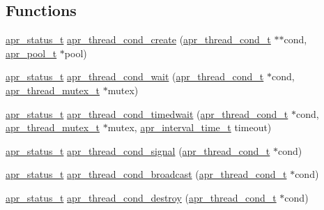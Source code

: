 \subsection*{Functions}
\begin{DoxyCompactItemize}
\item 
\hyperlink{group__apr__errno_gaf76ee4543247e9fb3f3546203e590a6c}{apr\+\_\+status\+\_\+t} \hyperlink{group__apr__thread__cond_gab39e8b722d46d23466e9e346ada85a7f}{apr\+\_\+thread\+\_\+cond\+\_\+create} (\hyperlink{group__apr__thread__cond_gae8f918d38bf1c58bc09670eee456ae5e}{apr\+\_\+thread\+\_\+cond\+\_\+t} $\ast$$\ast$cond, \hyperlink{group__apr__pools_gaf137f28edcf9a086cd6bc36c20d7cdfb}{apr\+\_\+pool\+\_\+t} $\ast$pool)
\item 
\hyperlink{group__apr__errno_gaf76ee4543247e9fb3f3546203e590a6c}{apr\+\_\+status\+\_\+t} \hyperlink{group__apr__thread__cond_ga789719a5f02bdab8b8abbc8bddd0406b}{apr\+\_\+thread\+\_\+cond\+\_\+wait} (\hyperlink{group__apr__thread__cond_gae8f918d38bf1c58bc09670eee456ae5e}{apr\+\_\+thread\+\_\+cond\+\_\+t} $\ast$cond, \hyperlink{group__apr__thread__mutex_ga95712060ba3a192036416e1ccef1db75}{apr\+\_\+thread\+\_\+mutex\+\_\+t} $\ast$mutex)
\item 
\hyperlink{group__apr__errno_gaf76ee4543247e9fb3f3546203e590a6c}{apr\+\_\+status\+\_\+t} \hyperlink{group__apr__thread__cond_ga67f2feecb7fa1929cc9b354dafd00306}{apr\+\_\+thread\+\_\+cond\+\_\+timedwait} (\hyperlink{group__apr__thread__cond_gae8f918d38bf1c58bc09670eee456ae5e}{apr\+\_\+thread\+\_\+cond\+\_\+t} $\ast$cond, \hyperlink{group__apr__thread__mutex_ga95712060ba3a192036416e1ccef1db75}{apr\+\_\+thread\+\_\+mutex\+\_\+t} $\ast$mutex, \hyperlink{group__apr__time_gaae2129185a395cc393f76fabf4f43e47}{apr\+\_\+interval\+\_\+time\+\_\+t} timeout)
\item 
\hyperlink{group__apr__errno_gaf76ee4543247e9fb3f3546203e590a6c}{apr\+\_\+status\+\_\+t} \hyperlink{group__apr__thread__cond_gadf7ad6c2731bc6128f969d3efc7ff5eb}{apr\+\_\+thread\+\_\+cond\+\_\+signal} (\hyperlink{group__apr__thread__cond_gae8f918d38bf1c58bc09670eee456ae5e}{apr\+\_\+thread\+\_\+cond\+\_\+t} $\ast$cond)
\item 
\hyperlink{group__apr__errno_gaf76ee4543247e9fb3f3546203e590a6c}{apr\+\_\+status\+\_\+t} \hyperlink{group__apr__thread__cond_gafbbedd2a07629fe3186343035ae83152}{apr\+\_\+thread\+\_\+cond\+\_\+broadcast} (\hyperlink{group__apr__thread__cond_gae8f918d38bf1c58bc09670eee456ae5e}{apr\+\_\+thread\+\_\+cond\+\_\+t} $\ast$cond)
\item 
\hyperlink{group__apr__errno_gaf76ee4543247e9fb3f3546203e590a6c}{apr\+\_\+status\+\_\+t} \hyperlink{group__apr__thread__cond_ga049e646e23c670f3a79fe25401b9c1b0}{apr\+\_\+thread\+\_\+cond\+\_\+destroy} (\hyperlink{group__apr__thread__cond_gae8f918d38bf1c58bc09670eee456ae5e}{apr\+\_\+thread\+\_\+cond\+\_\+t} $\ast$cond)
$$
\end{DoxyCompactItemize}
